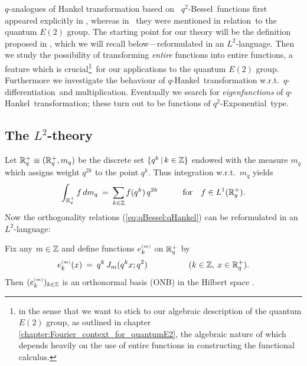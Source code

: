 

\begin{abs_chp}
$q$-analogues of Hankel transformation based on \little\ \mbox{$q^2$-Bessel}\
functions first appeared explicitly in \cite{KoornwSwartt}, whereas
in \cite{leonid:vainerman}\ they were mentioned in \mbox{relation}\ to
the quantum $E(2)$ group. The starting point for our theory will
be the definition proposed in \cite{KoornwSwartt},
which we will recall below---reformulated in an \mbox{$L^2$-language}\@.
Then we study  the possibility of transforming {\em entire\/} functions into entire
functions, a feature which is
crucial\footnote{in the sense that we want to stick to our algebraic description
of the quantum $E(2)$ group, as outlined in chapter \ref{chapter:Fourier_context_for_quantumE2},
the algebraic nature of which depends heavily on the use of entire functions
in constructing the functional calculus.}\ for our applications to the
quantum $E(2)$ group.
Furthermore we investigate the behaviour of \mbox{$q$-Hankel}\ transformation
w.r.t.\ \mbox{$q$-differentiation}\ and multiplication.
Eventually we search for {\em eigenfunctions\/} of \mbox{$q$-Hankel}\ transformation;
these turn out to be functions of \mbox{$q^2$-Exponential}\ type.
\end{abs_chp}



\subsection{The $L^2$-theory}

Let $\RR_q^+ \equiv (\RR_q^+,m_q)$ be the discrete set $\{ q^k \,|\, k\in\ZZ \}$
endowed with the measure $m_q$ which assigns weight $q^{2k}$ to the
point $q^k$. Thus integration w.r.t.\ $m_q$ yields
$$ \int_{\RR_q^+} f\,dm_q
               \:=\: \sum_{k\in \ZZ} f(q^k)\,q^{2k}
               \hspace{3em} \mbox{for} \hspace{1em}  f\in L^1(\RR_q^+).  $$
Now the orthogonality relations (\ref{eq:qBessel:qHankel})
can be reformulated in an $L^2$-language:


\begin{prop}
Fix any\/ $m\in\ZZ$ and define functions\/ $\basis{m}{k}$ on\/ $\RR_q^+$ by
$$  \basis{m}{k}(x) \:=\: q^k \,\J{m}{q^k x}
                       \hspace{5em} (k\in \ZZ,\: x\in\RR_q^+). $$
Then\/ $(\basis{m}{k})_{k\in \ZZ}$ is an orthonormal basis ({\scriptsize ONB}) in
the Hilbert space\/ \Ltwoq\@.
\end{prop}


